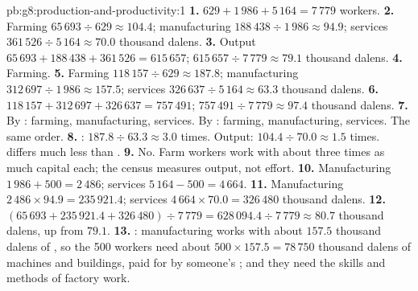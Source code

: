 \begin{solution}{pb:g8:production-and-productivity:1}
\textbf{1.} $629 + 1\,986 + 5\,164 = 7\,779$ workers.
\textbf{2.} Farming $65\,693 \div 629 \approx 104.4$; manufacturing $188\,438 \div 1\,986 \approx
94.9$; services $361\,526 \div 5\,164 \approx 70.0$ thousand dalens.
\textbf{3.} Output $65\,693 + 188\,438 + 361\,526 = 615\,657$; $615\,657 \div 7\,779 \approx 79.1$
thousand dalens.
\textbf{4.} Farming.
\textbf{5.} Farming $118\,157 \div 629 \approx 187.8$; manufacturing $312\,697 \div 1\,986 \approx
157.5$; services $326\,637 \div 5\,164 \approx 63.3$ thousand dalens.
\textbf{6.}  $118\,157 + 312\,697 + 326\,637 = 757\,491$; $757\,491 \div 7\,779 \approx 97.4$
thousand dalens.
\textbf{7.} By : farming, manufacturing, services. By : farming,
manufacturing, services. The same order.
\textbf{8.} : $187.8 \div 63.3 \approx 3.0$ times. Output: $104.4 \div 70.0 \approx 1.5$
times.  differs much less than .
\textbf{9.} No. Farm workers work with about three times as much capital each; the census measures
output, not effort.
\textbf{10.} Manufacturing $1\,986 + 500 = 2\,486$; services $5\,164 - 500 = 4\,664$.
\textbf{11.} Manufacturing $2\,486 \times 94.9 = 235\,921.4$; services $4\,664 \times 70.0 =
326\,480$ thousand dalens.
\textbf{12.} $(65\,693 + 235\,921.4 + 326\,480) \div 7\,779 = 628\,094.4 \div 7\,779 \approx 80.7$
thousand dalens, up from $79.1$.
\textbf{13.} : manufacturing works with about $157.5$ thousand dalens of ,
so the 500 workers need about $500 \times 157.5 = 78\,750$ thousand dalens of machines and buildings,
paid for by someone's ; and they need the skills and methods of factory work.
\end{solution}
